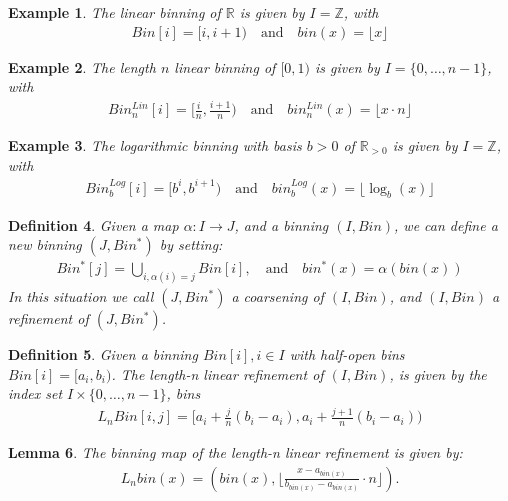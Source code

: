 \documentclass{article}
\theoremstyle{plain}
\newtheorem{definition}{Definition}[section]
\newtheorem{lemma}[definition]{Lemma}
\newtheorem{example}[definition]{Example}
\theoremstyle{remark}
\newcommand{\IR}{\mathbb{R}}
\newcommand{\IZ}{\mathbb{Z}}
\newcommand{\Union}{\bigcup}
\newcommand{\qtext}[1]{\quad\text{#1}\quad} %
\newcommand{\ra}{\rightarrow}
\newcommand{\floor}[1]{\lfloor#1\rfloor}
\begin{document}
\begin{example}
  The linear binning of $\IR$ is given by $I = \IZ$, with
  \begin{align*}
    Bin[i] = [i, i+1)  \qtext{and} bin(x)=\floor{x}
  \end{align*}
\end{example}

\begin{example}
  The length $n$ linear binning of $[0,1)$ is given by $I = \{0, \dots, n-1\}$, with
    \begin{align*}
      Bin^{Lin}_n[i]   = [ \frac{i}{n}, \frac{i+1}{n} )
      \qtext{and}
      bin^{Lin}_n(x) = \floor{x \cdot n}
    \end{align*}
\end{example}

\begin{example}
  The logarithmic binning with basis $b > 0$ of $\IR_{>0}$ is given by $I=\IZ$, with
  \begin{align*}
    Bin^{Log}_b[i] = [b^i, b^{i+1})
    \qtext{and}
    bin^{Log}_b(x)=\floor{\log_b(x)}
  \end{align*}
\end{example}

\begin{definition}\label{ref}
  Given a map $\alpha: I \ra J$, and a binning $(I, Bin)$, we can define a new binning
  $(J, Bin^*)$ by setting:
  \begin{align*}
    Bin^*[j] = \Union_{i, \alpha(i) = j} Bin[i], \qtext{and} bin^*(x) = \alpha(bin(x))
  \end{align*}
  In this situation we call $(J, Bin^*)$ a coarsening of $(I, Bin)$, and $(I, Bin)$ a refinement of $(J, Bin^*)$.
\end{definition}

\begin{definition}
  Given a binning $Bin[i], i\in I$ with half-open bins $Bin[i] = [a_i, b_i)$.
  The length-n linear refinement of $(I, Bin)$, is given by the index set $I \times \{0,\dots, n-1\}$,
  bins
  \begin{align}\label{eq:lref}
    L_nBin[i,j] = [ a_i + \frac{j}{n}(b_i - a_i), a_i + \frac{j+1}{n}(b_i - a_i) )
  \end{align}
\end{definition}

\begin{lemma}
  The binning map of the length-n linear refinement is given by:
  \begin{align}\label{eq:lrefmap}
    L_nbin(x) = ( bin(x), \floor{\frac{x - a_{bin(x)}}{b_{bin(x)} - a_{bin(x)}} \cdot n } ).
  \end{align}
\end{lemma}
\end{document}
